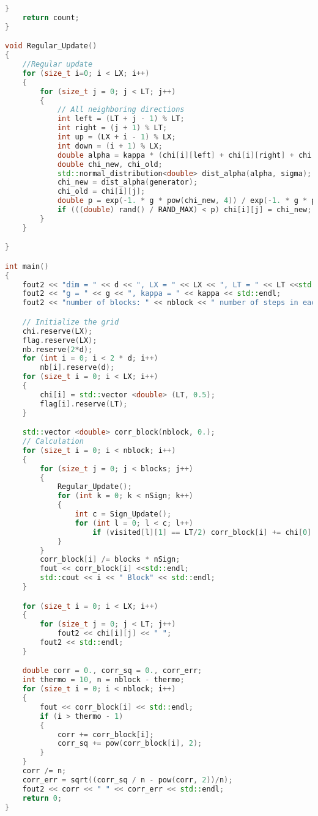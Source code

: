 \documentclass[12pt]{article}
\begin{document}
\begin{lstlisting}[language=C++]
	}
	return count; 
}

void Regular_Update()
{
	//Regular update
	for (size_t i=0; i < LX; i++)
	{
		for (size_t j = 0; j < LT; j++)
		{
			// All neighboring directions
			int left = (LT + j - 1) % LT; 
			int right = (j + 1) % LT; 
			int up = (LX + i - 1) % LX; 
			int down = (i + 1) % LX; 
			double alpha = kappa * (chi[i][left] + chi[i][right] + chi[up][j] + chi[down][j]); 
			double chi_new, chi_old; 
			std::normal_distribution<double> dist_alpha(alpha, sigma); 
			chi_new = dist_alpha(generator); 
			chi_old = chi[i][j]; 
			double p = exp(-1. * g * pow(chi_new, 4)) / exp(-1. * g * pow(chi_old, 4)); 
			if (((double) rand() / RAND_MAX) < p) chi[i][j] = chi_new; 
		}
	}

}

int main()
{
	fout2 << "dim = " << d << ", LX = " << LX << ", LT = " << LT <<std::endl; 
	fout2 << "g = " << g << ", kappa = " << kappa << std::endl; 
	fout2 << "number of blocks: " << nblock << " number of steps in each block: " << blocks << std::endl; 

	// Initialize the grid
	chi.reserve(LX); 
	flag.reserve(LX); 
	nb.reserve(2*d); 
	for (int i = 0; i < 2 * d; i++)
		nb[i].reserve(d);  
	for (size_t i = 0; i < LX; i++)
	{
		chi[i] = std::vector <double> (LT, 0.5); 
		flag[i].reserve(LT); 
	}

	std::vector <double> corr_block(nblock, 0.); 
	// Calculation
	for (size_t i = 0; i < nblock; i++)
	{
		for (size_t j = 0; j < blocks; j++)
		{
			Regular_Update(); 
			for (int k = 0; k < nSign; k++)
			{
				int c = Sign_Update(); 
				for (int l = 0; l < c; l++)
					if (visited[l][1] == LT/2) corr_block[i] += chi[0][0] * chi[visited[l][0]][visited[l][1]]; 
			}
		}
		corr_block[i] /= blocks * nSign; 
		fout << corr_block[i] <<std::endl; 
		std::cout << i << " Block" << std::endl; 
	}

	for (size_t i = 0; i < LX; i++)
 	{
		for (size_t j = 0; j < LT; j++)
			fout2 << chi[i][j] << " "; 
		fout2 << std::endl; 
	}

	double corr = 0., corr_sq = 0., corr_err; 
	int thermo = 10, n = nblock - thermo; 
	for (size_t i = 0; i < nblock; i++)
	{
		fout << corr_block[i] << std::endl; 
		if (i > thermo - 1)
		{
			corr += corr_block[i]; 
			corr_sq += pow(corr_block[i], 2); 
		}
	}
	corr /= n; 
	corr_err = sqrt((corr_sq / n - pow(corr, 2))/n); 
	fout2 << corr << " " << corr_err << std::endl; 
	return 0; 
}
\end{lstlisting}
\end{document}
